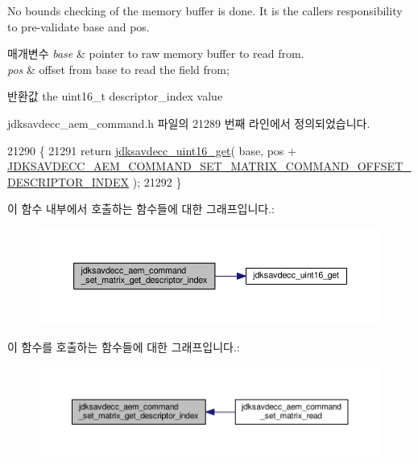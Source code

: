 No bounds checking of the memory buffer is done. It is the caller\textquotesingle{}s responsibility to pre-\/validate base and pos.


\begin{DoxyParams}{매개변수}
{\em base} & pointer to raw memory buffer to read from. \\
\hline
{\em pos} & offset from base to read the field from; \\
\hline
\end{DoxyParams}
\begin{DoxyReturn}{반환값}
the uint16\+\_\+t descriptor\+\_\+index value 
\end{DoxyReturn}


jdksavdecc\+\_\+aem\+\_\+command.\+h 파일의 21289 번째 라인에서 정의되었습니다.


\begin{DoxyCode}
21290 \{
21291     \textcolor{keywordflow}{return} \hyperlink{group__endian_ga3fbbbc20be954aa61e039872965b0dc9}{jdksavdecc\_uint16\_get}( base, pos + 
      \hyperlink{group__command__set__matrix_ga71eb4c95df20046f453be228dbbfd743}{JDKSAVDECC\_AEM\_COMMAND\_SET\_MATRIX\_COMMAND\_OFFSET\_DESCRIPTOR\_INDEX}
       );
21292 \}
\end{DoxyCode}


이 함수 내부에서 호출하는 함수들에 대한 그래프입니다.\+:
\nopagebreak
\begin{figure}[H]
\begin{center}
\leavevmode
\includegraphics[width=350pt]{group__command__set__matrix_ga2885acb0f0ace45fff15b2ec4c0a7f73_cgraph}
\end{center}
\end{figure}




이 함수를 호출하는 함수들에 대한 그래프입니다.\+:
\nopagebreak
\begin{figure}[H]
\begin{center}
\leavevmode
\includegraphics[width=350pt]{group__command__set__matrix_ga2885acb0f0ace45fff15b2ec4c0a7f73_icgraph}
\end{center}
\end{figure}


